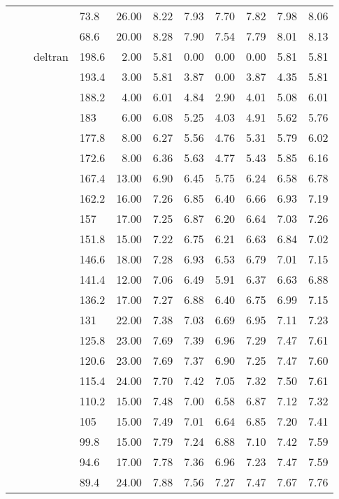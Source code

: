 \begin{longtable}{llllrrrrrrr}
   &  &  & 73.8 & 26.00 & 8.22 & 7.93 & 7.70 & 7.82 & 7.98 & 8.06 \\ 
   &  &  & 68.6 & 20.00 & 8.28 & 7.90 & 7.54 & 7.79 & 8.01 & 8.13 \\ 
   &  & deltran & 198.6 & 2.00 & 5.81 & 0.00 & 0.00 & 0.00 & 5.81 & 5.81 \\ 
   &  &  & 193.4 & 3.00 & 5.81 & 3.87 & 0.00 & 3.87 & 4.35 & 5.81 \\ 
   &  &  & 188.2 & 4.00 & 6.01 & 4.84 & 2.90 & 4.01 & 5.08 & 6.01 \\ 
   &  &  & 183 & 6.00 & 6.08 & 5.25 & 4.03 & 4.91 & 5.62 & 5.76 \\ 
   &  &  & 177.8 & 8.00 & 6.27 & 5.56 & 4.76 & 5.31 & 5.79 & 6.02 \\ 
   &  &  & 172.6 & 8.00 & 6.36 & 5.63 & 4.77 & 5.43 & 5.85 & 6.16 \\ 
   &  &  & 167.4 & 13.00 & 6.90 & 6.45 & 5.75 & 6.24 & 6.58 & 6.78 \\ 
   &  &  & 162.2 & 16.00 & 7.26 & 6.85 & 6.40 & 6.66 & 6.93 & 7.19 \\ 
   &  &  & 157 & 17.00 & 7.25 & 6.87 & 6.20 & 6.64 & 7.03 & 7.26 \\ 
   &  &  & 151.8 & 15.00 & 7.22 & 6.75 & 6.21 & 6.63 & 6.84 & 7.02 \\ 
   &  &  & 146.6 & 18.00 & 7.28 & 6.93 & 6.53 & 6.79 & 7.01 & 7.15 \\ 
   &  &  & 141.4 & 12.00 & 7.06 & 6.49 & 5.91 & 6.37 & 6.63 & 6.88 \\ 
   &  &  & 136.2 & 17.00 & 7.27 & 6.88 & 6.40 & 6.75 & 6.99 & 7.15 \\ 
   &  &  & 131 & 22.00 & 7.38 & 7.03 & 6.69 & 6.95 & 7.11 & 7.23 \\ 
   &  &  & 125.8 & 23.00 & 7.69 & 7.39 & 6.96 & 7.29 & 7.47 & 7.61 \\ 
   &  &  & 120.6 & 23.00 & 7.69 & 7.37 & 6.90 & 7.25 & 7.47 & 7.60 \\ 
   &  &  & 115.4 & 24.00 & 7.70 & 7.42 & 7.05 & 7.32 & 7.50 & 7.61 \\ 
   &  &  & 110.2 & 15.00 & 7.48 & 7.00 & 6.58 & 6.87 & 7.12 & 7.32 \\ 
   &  &  & 105 & 15.00 & 7.49 & 7.01 & 6.64 & 6.85 & 7.20 & 7.41 \\ 
   &  &  & 99.8 & 15.00 & 7.79 & 7.24 & 6.88 & 7.10 & 7.42 & 7.59 \\ 
   &  &  & 94.6 & 17.00 & 7.78 & 7.36 & 6.96 & 7.23 & 7.47 & 7.59 \\ 
   &  &  & 89.4 & 24.00 & 7.88 & 7.56 & 7.27 & 7.47 & 7.67 & 7.76 \\ 

\end{longtable}
